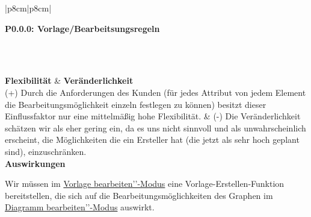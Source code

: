 \documentclass[enabledeprecatedfontcommands,fontsize=11pt,paper=a4,twoside]{scrartcl}
\newcounter{one}
\newcounter{two}[one]
\newcounter{three}[two]
\newcommand{\tone}{0\theone}
\newcommand{\ttwo}{0\thetwo}
\newcommand{\three}{\stepcounter{three}0\thethree}
\begin{document}
\begin{tabular} {|p{8cm}|p{8cm}|}
	\hline
	 {\parbox{16cm}{\textbf{\hypertarget{y}{P\tone.\ttwo.\three}: Vorlage/Bearbeitsungsregeln}} } \\  \hline\hline 
	\rule{0pt}{8ex}\\ [3ex] \hline
	\textbf{Flexibilität}  & \textbf{Veränderlichkeit} \\
	(+) Durch die Anforderungen des Kunden (für jedes Attribut von jedem Element die Bearbeitungsmöglichkeit einzeln festlegen zu können) besitzt dieser Einflussfaktor nur eine mittelmäßig hohe Flexibilität. &
	(-) Die Veränderlichkeit schätzen wir als eher gering ein, da es uns nicht sinnvoll und als unwahrscheinlich erscheint, die Möglichkeiten die ein Ersteller hat (die jetzt als sehr hoch geplant sind), einzuschränken.
	\\
	\hline
	 {\textbf{Auswirkungen}} \\
	 {\parbox{16cm}{Wir müssen im \hyperlink{Vorlage bearbeiten''-Modus}{Vorlage bearbeiten’’-Modus} eine Vorlage-Erstellen-Funktion bereitstellen, die sich auf die Bearbeitungsmöglichkeiten des Graphen im \hyperlink{Diagramm bearbeiten''-Modus}{Diagramm bearbeiten’’-Modus} auswirkt.} }\\ \hline
\end{tabular}
\\ \\ \\ \\%
\end{document}
